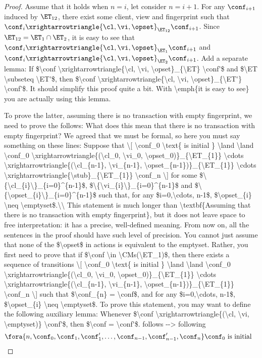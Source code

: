 \begin{proof}
Assume that it holds when \( n = i \), let consider \( n = i + 1 \).
For any \( \conf_{i+1} \) induced by \( \ET_{12} \), there exist some client, view and fingerprint such that \( \conf_i \xrightarrowtriangle{\cl, \vi, \opset}_{\ET_{12}} \conf_{i+1} \).
Since \( \ET_{12} = \ET_1 \cap \ET_2 \), it is easy to see that \( \conf_i \xrightarrowtriangle{\cl, \vi, \opset}_{\ET_{1}} \conf_{i+1} \) and \( \conf_i \xrightarrowtriangle{\cl, \vi, \opset}_{\ET_{2}} \conf_{i+1} \).
\ac{Add a separate lemma: If $\conf \xrightarrowtriangle{\cl, \vi, \opset}_{\ET} \conf'$ and $\ET \subseteq \ET'$, 
then $\conf \xrightarrowtriangle{\cl, \vi, \opset}_{\ET'} \conf'$. It should simplify this proof quite a bit. With \emph{it is easy to see} you are actually using this 
lemma.}

To prove the latter, assuming there is no transaction with empty fingerprint, we need to prove the follows:
\ac{What does this mean that there is no transaction with empty fingerprint? 
We agreed that we must be formal, so here you must say something on these lines: 
Suppose that 
\[
\conf_0 \text{ is initial } \land  \land \conf_0 \xrightarrowtriangle{(\cl_0, \vi_0, \opset_0)}_{\ET_{1}} \cdots \xrightarrowtriangle{(\cl_{n-1}, \vi_{n-1}, 
\opset_{n-1})}_{\ET_{1}} \cdots \xrightarrowtriangle{\stub}_{\ET_{1}} \conf_n
    \]
for some $\{\cl_{i}\}_{i=0}^{n-1}$, $\{\vi_{i}\}_{i=0}^{n-1}$ and $\{\opset_{i}\}_{i=0}^{n-1}$ such that, 
for any $i=0,\cdots, n-1$, $\opset_{i} \neq \emptyset$.\\
This statement is much longer than \textbf{Assuming that there is no transaction with empty fingerprint}, but it 
does not leave space to free interpretation: it has a precise, well-defined meaning. From now on, all the sentences 
in the proof should have such level of precision.}
\ac{You cannot just assume that none of the $\opset$ in actions is equivalent to the emptyset. 
Rather, you first need to prove that if $\conf \in \CMs(\ET_1)$, then there exists a sequence of transitions 
\[
\conf_0 \text{ is initial } \land  \land \conf_0 \xrightarrowtriangle{(\cl_0, \vi_0, \opset_0)}_{\ET_{1}} \cdots \xrightarrowtriangle{(\cl_{n-1}, \vi_{n-1}, 
\opset_{n-1})}_{\ET_{1}} \conf_n
    \]
such that $\conf_{n} = \conf$, and for any $i=0,\cdots, n-1$, $\opset_{i} \neq \emptyset$.
To prove this statement, you may want to define the following auxiliary lemma: 
Whenever $\conf \xrightarrowtriangle{(\cl, \vi, \emptyset)} \conf'$, then $\conf = \conf'$. }
\ac{follows --> following}
\[
\begin{array}{@{}l}
    \fora{n,\conf_0, \conf_1,\conf_1',\dots,\conf_{n-1}, \conf_{n-1}', \conf_n} \conf_0 \text{ is initial } \\

\end{array}\]
\end{proof}
